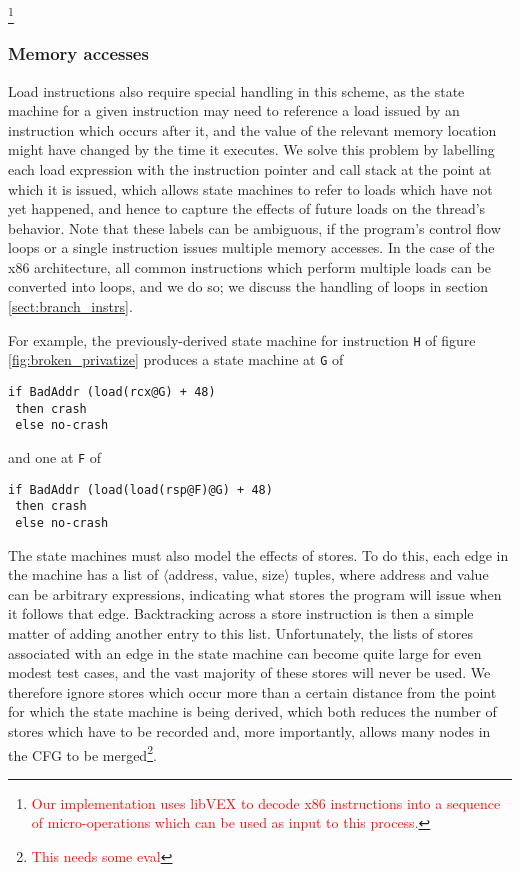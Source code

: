 \documentclass[10pt,twocolumn,preprint,natbib,authoryear]{sigplanconf}
\newcommand{\editorial}[1]{\textcolor{red}{\footnote{\textcolor{red}{#1}}}}
\begin{document}
\editorial{Our implementation uses libVEX to decode x86 instructions
  into a sequence of micro-operations which can be used as input to
  this process.} 

\subsubsection{Memory accesses}

Load instructions also require special handling in this scheme, as the
state machine for a given instruction may need to reference a load
issued by an instruction which occurs after it, and the value of the
relevant memory location might have changed by the time it executes.
We solve this problem by labelling each load expression with the
instruction pointer and call stack at the point at which it is issued,
which allows state machines to refer to loads which have not yet
happened, and hence to capture the effects of future loads on the
thread's behavior.  Note that these labels can be ambiguous, if the
program's control flow loops or a single instruction issues multiple
memory accesses.  In the case of the x86 architecture, all common
instructions which perform multiple loads can be converted into loops,
and we do so; we discuss the handling of loops in section
\ref{sect:branch_instrs}.

For example, the previously-derived state machine for instruction
\verb|H| of figure \ref{fig:broken_privatize} produces a state machine
at \verb|G| of

\begin{verbatim}
if BadAddr (load(rcx@G) + 48)
 then crash
 else no-crash
\end{verbatim}

and one at \verb|F| of

\begin{verbatim}
if BadAddr (load(load(rsp@F)@G) + 48)
 then crash
 else no-crash
\end{verbatim}

The state machines must also model the effects of stores.  To do this,
each edge in the machine has a list of $\langle{}$address, value,
size$\rangle{}$ tuples, where address and value can be arbitrary
expressions, indicating what stores the program will issue when it
follows that edge.  Backtracking across a store instruction is then a
simple matter of adding another entry to this list.  Unfortunately,
the lists of stores associated with an edge in the state machine can
become quite large for even modest test cases, and the vast majority
of these stores will never be used.  We therefore ignore stores which
occur more than a certain distance from the point for which the state
machine is being derived, which both reduces the number of stores
which have to be recorded and, more importantly, allows many nodes in
the CFG to be merged\editorial{This needs some eval}.
\end{document}
